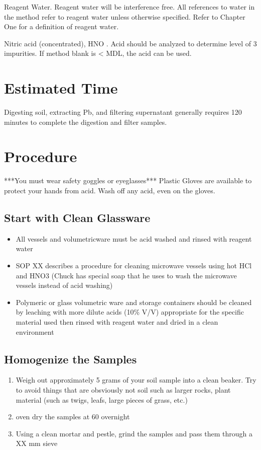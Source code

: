 \documentclass[12pt]{../SOP3_beta}\usepackage[]{graphicx}\usepackage[]{color}
\begin{document}
\NP Reagent Water. Reagent water will be interference free. All references to water in
the method refer to reagent water unless otherwise specified. Refer to Chapter One for a definition
of reagent water.

\NP Nitric acid (concentrated), HNO . Acid should be analyzed to determine level of 3
impurities. If method blank is < MDL, the acid can be used. 


\section{Estimated Time}

\NP Digesting soil, extracting Pb, and filtering supernatant  generally requires 120 minutes to complete the digestion and filter samples.


\section{Procedure}


***You must wear safety goggles or eyeglasses***
Plastic Gloves are available to protect your hands from acid. Wash off any acid, even on the gloves.

\subsection{Start with Clean Glassware}
  \begin{itemize}
  \item All vessels and volumetricware must be acid washed and rinsed with reagent water
  \item SOP XX describes a procedure for cleaning microwave vessels using hot HCl and HNO3 (Chuck has special soap that he uses to wash the microwave vessels instead of acid washing)
  \item Polymeric or glass volumetric ware and storage containers should be cleaned by leaching with more dilute acids (10\% V/V) appropriate for the specific material used then rinsed with reagent water and dried in a clean environment
  \end{itemize}
\subsection{Homogenize the Samples}
  \begin{enumerate}
  \item Weigh out approximately 5 grams of your soil sample into a clean beaker. Try to avoid things that are obsviously not soil such as larger rocks, plant material (such as twigs, leafs, large pieces of grass, etc.)
  \item oven dry the samples at 60 \celsius overnight
  \item Using a clean mortar and pestle, grind the samples and pass them through a XX mm sieve %
  \end{enumerate}
\end{document}
